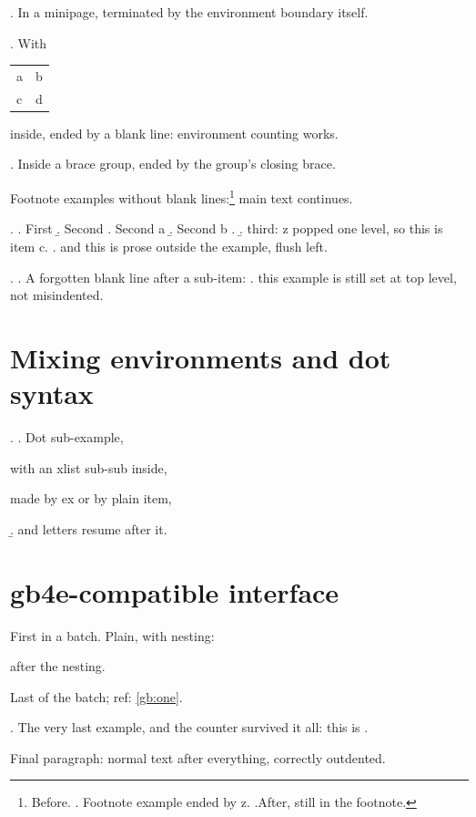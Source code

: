 \documentclass{article}
\begin{document}
\begin{minipage}{0.8\textwidth}
\ex. In a minipage, terminated by the environment boundary itself.\end{minipage}

\ex. With \begin{tabular}{ll} a & b \\ c & d \end{tabular} inside,
ended by a blank line: environment counting works.

{\ex. Inside a brace group, ended by the group's closing brace.}

Footnote examples without blank lines:\footnote{Before.
\ex. Footnote example ended by z. \z.After, still in the footnote.}
main text continues.

\ex.
\a. First
\b. Second
\a. Second a
\b. Second b
\z.
\b. third: z popped one level, so this is item c.
\z.
and this is prose outside the example, flush left.

\ex.
\a. A forgotten blank line after a sub-item:
\ex. this example is still set at top level, not misindented.

\section*{Mixing environments and dot syntax}

\ex.
\a. Dot sub-example,
\begin{xlist}
\ex with an xlist sub-sub inside,
\item made by ex or by plain item,
\end{xlist}
\b. and letters resume after it.

\section*{gb4e-compatible interface}

\begin{exe}
\ex\label{gb:one} First in a batch.
\ex Plain, with nesting:
 \begin{xlist}
 \ex
  \begin{xlist}
  \end{xlist}
 \ex after the nesting.
 \end{xlist}
\ex Last of the batch; ref: \ref{gb:one}.
\end{exe}

\ex. The very last example, and the counter survived it all: this is \Last.

Final paragraph: normal text after everything, correctly outdented.
\end{document}
